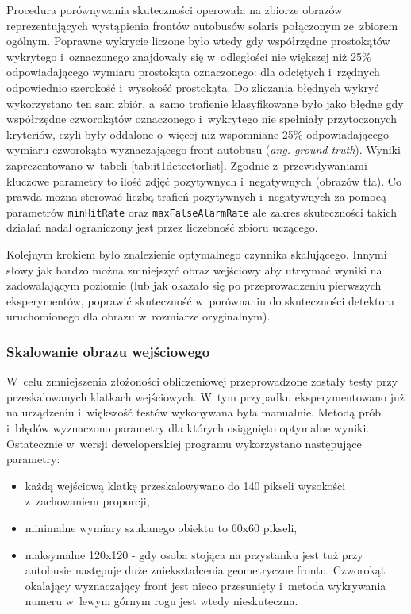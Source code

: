 Procedura porównywania skuteczności operowała na zbiorze obrazów
reprezentujących wystąpienia frontów autobusów solaris połączonym
ze~zbiorem ogólnym. Poprawne
wykrycie liczone było wtedy gdy współrzędne prostokątów wykrytego
i~oznaczonego znajdowały się w~odległości nie większej niż 25\% odpowiadającego
wymiaru prostokąta oznaczonego: dla odciętych i~rzędnych odpowiednio szerokość
i~wysokość prostokąta. Do zliczania błędnych wykryć wykorzystano ten sam zbiór, a~samo trafienie klasyfikowane było jako błędne 
gdy współrzędne czworokątów oznaczonego i~wykrytego nie 
spełniały przytoczonych kryteriów, czyli były oddalone o~więcej niż wspomniane
25\% odpowiadającego wymiaru czworokąta wyznaczającego 
front autobusu (\textit{ang. ground truth}).
Wyniki zaprezentowano w~tabeli \ref{tab:it1detectorlist}.
Zgodnie z~przewidywaniami kluczowe parametry to ilość zdjęć
pozytywnych i~negatywnych (obrazów tła). Co prawda można 
sterować liczbą trafień pozytywnych i~negatywnych za pomocą parametrów \verb|minHitRate| oraz
\verb|maxFalseAlarmRate| ale zakres skuteczności takich działań nadal
ograniczony jest przez liczebność zbioru uczącego.

Kolejnym krokiem było znalezienie
optymalnego czynnika skalującego. Innymi słowy jak bardzo można zmniejszyć
obraz wejściowy aby utrzymać wyniki na zadowalającym poziomie
(lub jak okazało się po przeprowadzeniu pierwszych eksperymentów,
poprawić skuteczność w~porównaniu do skuteczności detektora uruchomionego
dla obrazu w~rozmiarze oryginalnym).

\subsubsection{Skalowanie obrazu wejściowego}

W~celu zmniejszenia złożoności obliczeniowej przeprowadzone zostały
testy przy przeskalowanych klatkach wejściowych. W~tym przypadku
eksperymentowano już na urządzeniu i~większość testów wykonywana była
manualnie. Metodą prób i~błędów wyznaczono parametry dla których
osiągnięto optymalne wyniki. Ostatecznie w~wersji deweloperskiej 
programu wykorzystano następujące parametry:

\begin{itemize}
    \item każdą wejściową klatkę przeskalowywano do 140 pikseli wysokości
        z~zachowaniem proporcji,
    \item minimalne wymiary szukanego obiektu to 60x60 pikseli,
    \item maksymalne 120x120 - gdy osoba stojąca na przystanku jest tuż
        przy autobusie następuje duże zniekształcenia geometryczne
        frontu. Czworokąt okalający wyznaczający front jest nieco
        przesunięty i~metoda wykrywania numeru w~lewym górnym rogu jest
        wtedy nieskuteczna.
\end{itemize}

